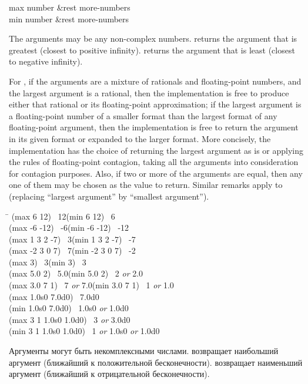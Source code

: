 \begin{defun}[Function]
max number &rest more-numbers \\
min number &rest more-numbers

The arguments may be any non-complex numbers.
 returns the argument that is greatest (closest
to positive infinity).
 returns the argument that is least (closest to
negative infinity).

For ,
if the arguments are a mixture of rationals and floating-point
numbers, and the largest argument
is a rational, then the implementation is free to
produce either that rational or its floating-point approximation;
if the largest argument is a floating-point number of a smaller format
than the largest format of any floating-point argument,
then the implementation is free to
return the argument in its given format or expanded to the larger format.
More concisely, the implementation has the choice of returning the largest
argument as is or applying the rules of floating-point contagion,
taking all the arguments into consideration for contagion purposes.
Also, if two or more of the arguments are equal, then any one
of them may be chosen as the value to return.
Similar remarks apply to  (replacing ``largest argument'' by
``smallest argument'').

\begin{lisp}
\textwidth\=\kill
(max 6 12) \EV\ 12\>(min 6 12) \EV\ 6 \\
(max -6 -12) \EV\ -6\>(min -6 -12) \EV\ -12 \\
(max 1 3 2 -7) \EV\ 3\>(min 1 3 2 -7) \EV\ -7 \\
(max -2 3 0 7) \EV\ 7\>(min -2 3 0 7) \EV\ -2 \\
(max 3) \EV\ 3\>(min 3) \EV\ 3 \\
(max 5.0 2) \EV\ 5.0\>(min 5.0 2) \EV\ 2 \emph{or} 2.0 \\
(max 3.0 7 1) \EV\ 7 \emph{or} 7.0\>(min 3.0 7 1) \EV\ 1 \emph{or} 1.0 \\
(max 1.0s0 7.0d0) \EV\ 7.0d0 \\
(min 1.0s0 7.0d0) \EV\ 1.0s0 \emph{or} 1.0d0 \\
(max 3 1 1.0s0 1.0d0) \EV\ 3 \emph{or} 3.0d0 \\
(min 3 1 1.0s0 1.0d0) \EV\ 1 \emph{or} 1.0s0 \emph{or} 1.0d0
\end{lisp}

Аргументы могут быть некомплексными числами.
 возвращает наибольший аргумент (ближайший к положительной
бесконечности).
 возвращает наименьший аргумент (ближайший к отрицательной
бесконечности).


\end{defun}
